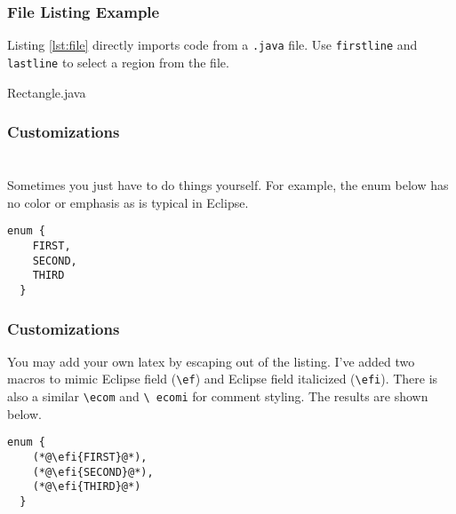 \documentclass{beamer}
\begin{document}
\begin{frame}[fragile]
  \frametitle{File Listing Example}

  Listing \ref{lst:file} directly imports code from a \texttt{.java} file. Use
  \texttt{firstline} and \texttt{lastline} to select a region from the
  file.

  
  {Rectangle.java}
  
\end{frame}


\begin{frame}[fragile]
  \frametitle{Customizations}

  \section*{}

  Sometimes you just have to do things yourself.
  For example, the enum below has no color or emphasis as is typical in Eclipse. 

\begin{lstlisting}[caption={Without manual customizations.}, label={lst:nocustom}]
  enum {
    FIRST,
    SECOND,
    THIRD
  }
\end{lstlisting}

\end{frame}


\begin{frame}[fragile]
  \frametitle{Customizations}

  You may add your own latex by escaping out of the listing.  I've added
  two macros to mimic Eclipse field (\texttt{\textbackslash ef}) and
  Eclipse field italicized (\texttt{\textbackslash efi}).  There is also
  a similar \texttt{\textbackslash ecom} and \texttt{\textbackslash
    ecomi} for comment styling. The results are shown below.


\begin{lstlisting}[caption={With manual customizations.}, label={lst:custom}]
  enum {
    (*@\efi{FIRST}@*),
    (*@\efi{SECOND}@*),
    (*@\efi{THIRD}@*)
  }
\end{lstlisting}

\end{frame}
\end{document}
